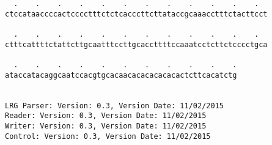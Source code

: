 \documentclass{article}
\begin{document}
\begin{Verbatim}
  .    .    .    .    .    .    .    .    .    .    .    .  
ctccataaccccactcccctttctctcacccttcttataccgcaaacctttctacttcct
                                                            
  .    .    .    .    .    .    .    .    .    .    .    .  
ctttcattttctattcttgcaatttccttgcaccttttccaaatcctcttctcccctgca
                                                            
  .    .    .    .    .    .    .    .    .    .    .
ataccatacaggcaatccacgtgcacaacacacacacacactcttcacatctg
                                                     
                                                     
LRG Parser: Version: 0.3, Version Date: 11/02/2015
Reader: Version: 0.3, Version Date: 11/02/2015
Writer: Version: 0.3, Version Date: 11/02/2015
Control: Version: 0.3, Version Date: 11/02/2015
\end{Verbatim}
\end{document}
